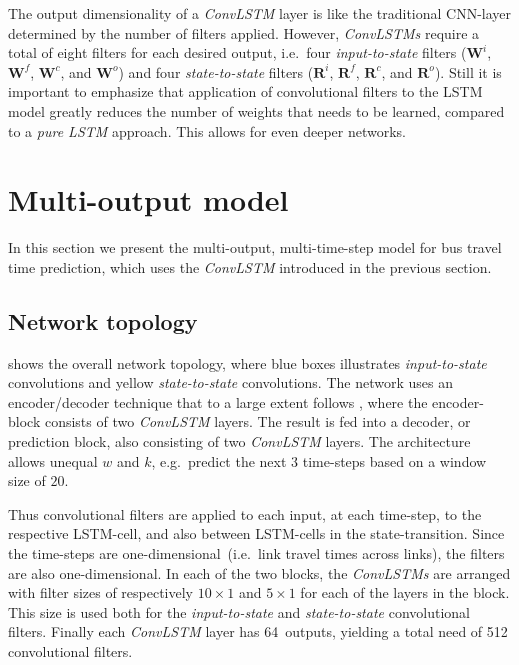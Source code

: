 \documentclass[preprint,11pt,5p,twocolumn]{elsarticle}
\newcommand{\matr}[1]{\mathbf{#1}}
\begin{document}
The output dimensionality of a \emph{ConvLSTM} layer is like the traditional CNN-layer determined by the number of filters applied. However, \emph{ConvLSTMs} require a total of eight filters for each desired output, i.e.\ four \emph{input-to-state} filters ($\matr{W}^i$, $\matr{W}^f$, $\matr{W}^c$, and $\matr{W}^o$) and four \emph{state-to-state} filters ($\matr{R}^i$, $\matr{R}^f$, $\matr{R}^c$, and $\matr{R}^o$).
Still it is important to emphasize that application of convolutional filters to the LSTM model greatly reduces the number of weights that needs to be learned, compared to a \emph{pure LSTM} approach. This allows for even deeper networks.
\newpage

\section{Multi-output model}
\label{sec:model}
In this section we present the multi-output, multi-time-step model for bus travel time prediction, which uses the \emph{ConvLSTM} introduced in the previous section.

\subsection{Network topology}


 shows the overall network topology, where blue boxes illustrates \emph{input-to-state} convolutions and yellow \emph{state-to-state} convolutions. The network uses an encoder/decoder technique that to a large extent follows \cite{ConvLSTM}, where the encoder-block consists of two \emph{ConvLSTM} layers. The result is fed into a decoder, or prediction block, also consisting of two \emph{ConvLSTM} layers. The architecture allows unequal $w$ and $k$, e.g.\ predict the next $3$ time-steps based on a window size of $20$.

Thus convolutional filters are applied to each input, at each time-step, to the respective LSTM-cell, and also between LSTM-cells in the state-transition. Since the time-steps are one-dimensional~(i.e.\ link travel times across links), the filters are also one-dimensional. In each of the two blocks, the \emph{ConvLSTMs} are arranged with filter sizes of respectively $10\times1$ and $5\times1$ for each of the layers in the block. This size is used both for the \emph{input-to-state} and \emph{state-to-state} convolutional filters. Finally each \emph{ConvLSTM} layer has 64~outputs, yielding a total need of 512 convolutional filters.
\end{document}
